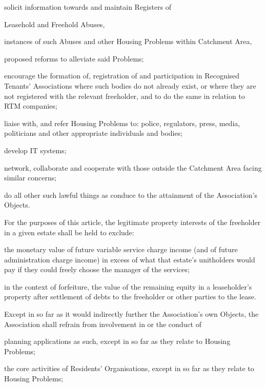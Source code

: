 \documentclass[10pt]{mk-articles-of-association}
\newcommand{\RA}[0]{Residents' Organisation}
\newcommand{\RTA}[0]{Recognised Tenants' Association}
\newcommand{\LAFA}[0]{Leasehold and Freehold Abuses}
\begin{document}
\begin{constenum}
\begin{constenum}
  \item solicit information towards and maintain Registers of
    \begin{constenum}
    \item \LAFA, \ITand
    \item instances of such Abuses and other Housing Problems within
      Catchment Area,
    \item proposed reforms to alleviate said Problems;
    \end{constenum}

  \item encourage the formation of, registration of and participation
    in \RTA{}s where such bodies do not already exist, or where they
    are not registered with the relevant freeholder, and to do the same
    in relation to RTM companies;

  \item liaise with, and refer Housing Problems to: police, regulators,
    press, media, politicians and other appropriate individuals and bodies;

  \item develop IT systems;

  \item network, collaborate and cooperate with those outside the
    Catchment Area facing similar concerns;

  \item do all other such lawful things as conduce to the attainment
    of the Association's Objects.
\end{constenum}

\item For the purposes of this article, the legitimate property interests of
  the freeholder in a given estate shall be held to exclude:
  \begin{constenum}
    \item the monetary value of future variable service charge income
      (and of future administration charge income) in excess of what
      that estate's unitholders would pay if they could freely choose
      the manager of the services; \ITand
    \item in the context of forfeiture, the value of the remaining equity in a
      leaseholder's property after settlement of debts to the freeholder or
      other parties to the lease.
  \end{constenum}

\item Except in so far as it would indirectly further the Association's own
  Objects, the Association shall refrain from involvement in or the conduct of
  \begin{constenum}
  \item planning applications as such, except in so far as they relate
    to Housing Problems;
  \item the core activities of \RA{}s, except in so far as they
    relate to Housing Problems;
  \end{constenum}


\end{constenum}
\end{document}
